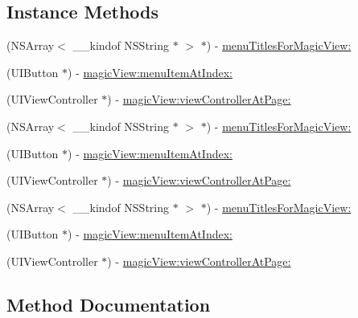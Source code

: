 \subsection*{Instance Methods}
\begin{DoxyCompactItemize}
\item 
(N\+S\+Array$<$ \+\_\+\+\_\+kindof N\+S\+String $\ast$ $>$ $\ast$) -\/ \mbox{\hyperlink{protocol_v_t_magic_view_data_source_01-p_ad8d45d2488d12e71905c23e1fa908cff}{menu\+Titles\+For\+Magic\+View\+:}}
\item 
(U\+I\+Button $\ast$) -\/ \mbox{\hyperlink{protocol_v_t_magic_view_data_source_01-p_ae24594b19e47d8e2803257e6a3d3e09b}{magic\+View\+:menu\+Item\+At\+Index\+:}}
\item 
(U\+I\+View\+Controller $\ast$) -\/ \mbox{\hyperlink{protocol_v_t_magic_view_data_source_01-p_a87d024c23dfc7b73dbc606127337d138}{magic\+View\+:view\+Controller\+At\+Page\+:}}
\item 
(N\+S\+Array$<$ \+\_\+\+\_\+kindof N\+S\+String $\ast$ $>$ $\ast$) -\/ \mbox{\hyperlink{protocol_v_t_magic_view_data_source_01-p_ad8d45d2488d12e71905c23e1fa908cff}{menu\+Titles\+For\+Magic\+View\+:}}
\item 
(U\+I\+Button $\ast$) -\/ \mbox{\hyperlink{protocol_v_t_magic_view_data_source_01-p_ae24594b19e47d8e2803257e6a3d3e09b}{magic\+View\+:menu\+Item\+At\+Index\+:}}
\item 
(U\+I\+View\+Controller $\ast$) -\/ \mbox{\hyperlink{protocol_v_t_magic_view_data_source_01-p_a87d024c23dfc7b73dbc606127337d138}{magic\+View\+:view\+Controller\+At\+Page\+:}}
\item 
(N\+S\+Array$<$ \+\_\+\+\_\+kindof N\+S\+String $\ast$ $>$ $\ast$) -\/ \mbox{\hyperlink{protocol_v_t_magic_view_data_source_01-p_ad8d45d2488d12e71905c23e1fa908cff}{menu\+Titles\+For\+Magic\+View\+:}}
\item 
(U\+I\+Button $\ast$) -\/ \mbox{\hyperlink{protocol_v_t_magic_view_data_source_01-p_ae24594b19e47d8e2803257e6a3d3e09b}{magic\+View\+:menu\+Item\+At\+Index\+:}}
\item 
(U\+I\+View\+Controller $\ast$) -\/ \mbox{\hyperlink{protocol_v_t_magic_view_data_source_01-p_a87d024c23dfc7b73dbc606127337d138}{magic\+View\+:view\+Controller\+At\+Page\+:}}
\end{DoxyCompactItemize}


\subsection{Method Documentation}
\mbox{\label{protocol_v_t_magic_view_data_source_01-p_ae24594b19e47d8e2803257e6a3d3e09b}} 
